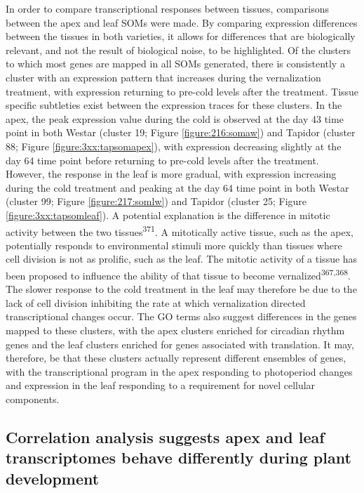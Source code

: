 \documentclass[12pt,]{book}
\begin{document}
In order to compare transcriptional responses between tissues,
comparisons between the apex and leaf SOMs were made. By comparing
expression differences between the tissues in both varieties, it allows
for differences that are biologically relevant, and not the result of
biological noise, to be highlighted. Of the clusters to which most genes
are mapped in all SOMs generated, there is consistently a cluster with
an expression pattern that increases during the vernalization treatment,
with expression returning to pre-cold levels after the treatment. Tissue
specific subtleties exist between the expression traces for these
clusters. In the apex, the peak expression value during the cold is
observed at the day 43 time point in both Westar (cluster 19; Figure
\ref{figure:216:somaw}) and Tapidor (cluster 88; Figure
\ref{figure:3xx:tapsomapex}), with expression decreasing slightly at the
day 64 time point before returning to pre-cold levels after the
treatment. However, the response in the leaf is more gradual, with
expression increasing during the cold treatment and peaking at the day
64 time point in both Westar (cluster 99; Figure \ref{figure:217:somlw})
and Tapidor (cluster 25; Figure \ref{figure:3xx:tapsomleaf}). A
potential explanation is the difference in mitotic activity between the
two tissues\textsuperscript{371}. A mitotically active tissue, such as
the apex, potentially responds to environmental stimuli more quickly
than tissues where cell division is not as prolific, such as the leaf.
The mitotic activity of a tissue has been proposed to influence the
ability of that tissue to become vernalized\textsuperscript{367,368}.
The slower response to the cold treatment in the leaf may therefore be
due to the lack of cell division inhibiting the rate at which
vernalization directed transcriptional changes occur. The GO terms also
suggest differences in the genes mapped to these clusters, with the apex
clusters enriched for circadian rhythm genes and the leaf clusters
enriched for genes associated with translation. It may, therefore, be
that these clusters actually represent different ensembles of genes,
with the transcriptional program in the apex responding to photoperiod
changes and expression in the leaf responding to a requirement for novel
cellular components.

\subsection{Correlation analysis suggests apex and leaf transcriptomes
behave differently during plant
development}\label{section:winter:correlation}
\end{document}
